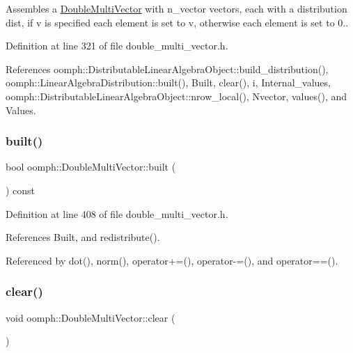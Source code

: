 Assembles a \hyperlink{classoomph_1_1DoubleMultiVector}{Double\+Multi\+Vector} with n\+\_\+vector vectors, each with a distribution dist, if v is specified each element is set to v, otherwise each element is set to 0.. 



Definition at line 321 of file double\+\_\+multi\+\_\+vector.\+h.



References oomph\+::\+Distributable\+Linear\+Algebra\+Object\+::build\+\_\+distribution(), oomph\+::\+Linear\+Algebra\+Distribution\+::built(), Built, clear(), i, Internal\+\_\+values, oomph\+::\+Distributable\+Linear\+Algebra\+Object\+::nrow\+\_\+local(), Nvector, values(), and Values.

\mbox{\label{classoomph_1_1DoubleMultiVector_ad7ba248dc49b6bda0b49c28c677a82e7}} 
\subsubsection{\texorpdfstring{built()}{built()}}
{\footnotesize\ttfamily bool oomph\+::\+Double\+Multi\+Vector\+::built (\begin{DoxyParamCaption}{ }\end{DoxyParamCaption}) const\hspace{0.3cm}{\ttfamily [inline]}}



Definition at line 408 of file double\+\_\+multi\+\_\+vector.\+h.



References Built, and redistribute().



Referenced by dot(), norm(), operator+=(), operator-\/=(), and operator==().

\mbox{\label{classoomph_1_1DoubleMultiVector_a6e4ab708964cd1dce2d47ea2c0fc91df}} 
\subsubsection{\texorpdfstring{clear()}{clear()}}
{\footnotesize\ttfamily void oomph\+::\+Double\+Multi\+Vector\+::clear (\begin{DoxyParamCaption}{ }\end{DoxyParamCaption})\hspace{0.3cm}{\ttfamily [inline]}}




